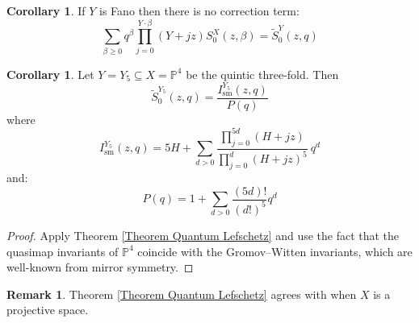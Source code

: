 \documentclass[11pt]{amsart}
\newcommand{\PP}{\mathbb P}
\theoremstyle{definition}
\newtheorem{cor}[thm]{Corollary}
\theoremstyle{definition}
\newtheorem{remark}[thm]{Remark}
\begin{document}
\begin{cor}
 If $Y$ is Fano then there is no correction term:
\begin{equation*} \sum_{\beta\geq 0} q^\beta\prod_{j=0}^{Y\cdot\beta}(Y+jz)S_0^X(z,\beta) = \tilde{S}_0^Y(z,q) \end{equation*}
\end{cor}

\begin{cor}
Let $Y = Y_5 \subseteq  X = \PP^4$ be the quintic three-fold. Then
\begin{equation*} \tilde{S}_0^{Y_5}(z,q)=\dfrac{I_{\text{sm}}^{Y_5}(z,q)}{P(q)} \end{equation*}
where
\begin{equation*} I_{\text{sm}}^{Y_5}(z,q)=5H+\sum_{d>0}\frac{\prod_{j=0}^{5d}(H+jz)}{\prod_{j=0}^{d}(H+jz)^5} \ q^d \end{equation*}
and:
\begin{equation*} P(q)=1+\sum_{d>0}\frac{(5d)!}{(d!)^5}q^d \end{equation*}
\end{cor}
\begin{proof} Apply Theorem \ref{Theorem Quantum Lefschetz} and use the fact that the quasimap invariants of $\PP^4$ coincide with the Gromov--Witten invariants, which are well-known from mirror symmetry. \end{proof}

\begin{remark}
Theorem \ref{Theorem Quantum Lefschetz} agrees with \cite[Theorem~1]{CZ-mirror} when $X$ is a projective space.
\end{remark}
\end{document}
